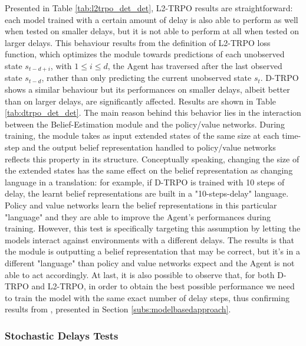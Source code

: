                 Presented in Table \ref{tab:l2trpo_det_det}, L2-TRPO results are straightforward: each model trained with a certain amount of delay is also able to perform as well when tested on smaller delays, but it is not able to perform at all when tested on larger delays. This behaviour results from the definition of L2-TRPO loss function, which optimizes the module towards predictions of each unobserved state $s_{t-d+i}$, with $1 \leq i \leq d$, the Agent has traversed after the last observed state $s_{t-d}$, rather than only predicting the current unobserved state $s_t$. \newline
                D-TRPO shows a similar behaviour but its performances on smaller delays, albeit better than on larger delays, are significantly affected. Results are shown in Table \ref{tab:dtrpo_det_det}. The main reason behind this behavior lies in the interaction between the Belief-Estimation module and the policy/value networks. During training, the module takes as input extended states of the same size at each time-step and the output belief representation handled to policy/value networks reflects this property in its structure. Conceptually speaking, changing the size of the extended states has the same effect on the belief representation as changing language in a translation: for example, if D-TRPO is trained with 10 steps of delay, the learnt belief representations are built in a "10-steps-delay" language. Policy and value networks learn the belief representations in this particular "language" and they are able to improve the Agent's performances during training. However, this test is specifically targeting this assumption by letting the models interact against environments with a different delays. The results is that the module is outputting a belief representation that may be correct, but it's in a different "language" than policy and value networks expect and the Agent is not able to act accordingly. \newline
                At last, it is also possible to observe that, for both D-TRPO and L2-TRPO, in order to obtain the best possible performance we need to train the model with the same exact number of delay steps, thus confirming results from , presented in Section \ref{subs:modelbasedapproach}.
                
            \subsubsection{Stochastic Delays Tests}
            
